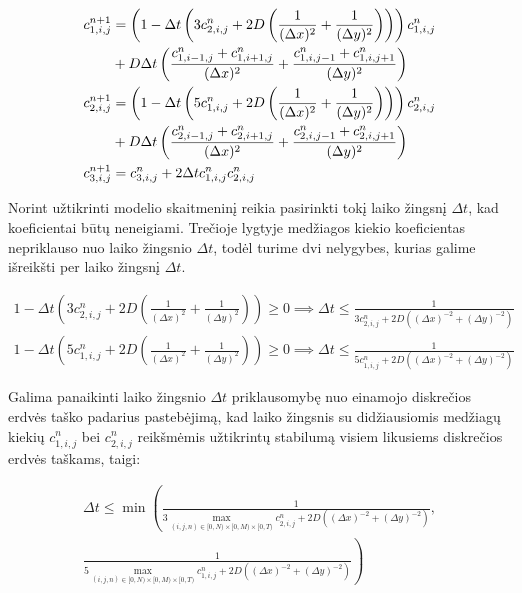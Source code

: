 \documentclass{VUMIFInfKursinis}
\begin{document}
\begin{subequations}
    \begin{align}
    c^{n+1}_{1,i,j}&=
    \left(1-\Delta t\left(3c^{n}_{2,i,j}+2D\left(\frac{1}{(\Delta x)^2}+\frac{1}{(\Delta y)^2}\right)\right)\right)c^n_{1,i,j}\notag\\
    &+D\Delta t\left(\frac{c^n_{1,i-1,j}+c^n_{1,i+1,j}}{(\Delta x)^2}+\frac{c^n_{1,i,j-1}+c^n_{1,i,j+1}}{(\Delta y)^2}\right)\\
    c^{n+1}_{2,i,j}&=
    \left(1-\Delta t\left(5c^{n}_{1,i,j}+2D\left(\frac{1}{(\Delta x)^2}+\frac{1}{(\Delta y)^2}\right)\right)\right)c^n_{2,i,j}\notag\\
    &+D\Delta t\left(\frac{c^n_{2,i-1,j}+c^n_{2,i+1,j}}{(\Delta x)^2}+\frac{c^n_{2,i,j-1}+c^n_{2,i,j+1}}{(\Delta y)^2}\right)\\
    c^{n+1}_{3,i,j}&=c^n_{3,i,j}+2\Delta tc^{n}_{1,i,j}c^{n}_{2,i,j}
    \end{align}
\end{subequations}

Norint užtikrinti modelio skaitmeninį reikia pasirinkti tokį laiko žingsnį $\Delta t$, kad koeficientai būtų neneigiami.
Trečioje lygtyje medžiagos kiekio koeficientas nepriklauso nuo laiko žingsnio $\Delta t$, todėl turime dvi nelygybes, kurias
galime išreikšti per laiko žingsnį $\Delta t$.

\begin{align*}
    1-\Delta t\left(3c^{n}_{2,i,j}+2D\left(\frac{1}{(\Delta x)^2}+\frac{1}{(\Delta y)^2}\right)\right)\geq 0\implies
    \Delta t\leq\frac{1}{3c^{n}_{2,i,j}+2D\left((\Delta x)^{-2}+(\Delta y)^{-2}\right)}\\
    1-\Delta t\left(5c^{n}_{1,i,j}+2D\left(\frac{1}{(\Delta x)^2}+\frac{1}{(\Delta y)^2}\right)\right)\geq 0\implies
    \Delta t\leq\frac{1}{5c^{n}_{1,i,j}+2D\left((\Delta x)^{-2}+(\Delta y)^{-2}\right)}
\end{align*}

\newpage
Galima panaikinti laiko žingsnio $\Delta t$ priklausomybę nuo einamojo diskrečios erdvės taško padarius pastebėjimą,
kad laiko žingsnis su didžiausiomis medžiagų kiekių $c^n_{1,i,j}$ bei $c^n_{2,i,j}$ reikšmėmis užtikrintų stabilumą visiem
likusiems diskrečios erdvės taškams, taigi:

\begin{align*}
    \Delta t\leq\min\left(
    \frac{1}{3\max\limits_{(i,j,n)\in[0,N)\times[0,M)\times[0,T)}c^{n}_{2,i,j}
    +2D\left((\Delta x)^{-2}+(\Delta y)^{-2}\right)},\right.\\
    \left. \frac{1}{5\max\limits_{(i,j,n)\in[0,N)\times[0,M)\times[0,T)}c^{n}_{1,i,j}
    +2D\left((\Delta x)^{-2}+(\Delta y)^{-2}\right)}
    \right)
\end{align*}
\end{document}
